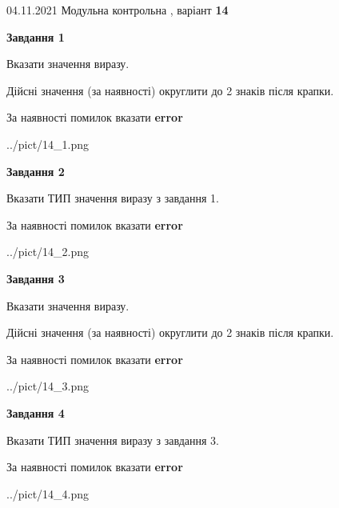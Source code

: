 \documentclass[11pt, ukrainian]{article}
\begin{document}
{04.11.2021 Модульна контрольна , варіант  \No \textbf { 14 }\par}
{
\begin {large}
{\begin {center}\textbf{Завдання 1}\end {center}}\par
Вказати значення виразу. \par
Дійсні значення (за наявності) округлити до 2 знаків після крапки. \par
За наявності помилок вказати \textbf{error}

\begin{center}
	{../pict/14_1.png}
\end{center}
\newpage

{\begin {center}\textbf{Завдання 2}\end {center}}\par
Вказати ТИП значення виразу з завдання 1. \par
За наявності помилок вказати \textbf{error}

\begin{center}
	{../pict/14_2.png}
\end{center}
\newpage

{\begin {center}\textbf{Завдання 3}\end {center}}\par
Вказати значення виразу. \par
Дійсні значення (за наявності) округлити до 2 знаків після крапки. \par
За наявності помилок вказати \textbf{error}

\begin{center}
	{../pict/14_3.png}
\end{center}
\newpage

{\begin {center}\textbf{Завдання 4}\end {center}}\par
Вказати ТИП значення виразу з завдання 3. \par
За наявності помилок вказати \textbf{error}

\begin{center}
	{../pict/14_4.png}
\end{center}
\newpage


\end{large}}
\end{document}
